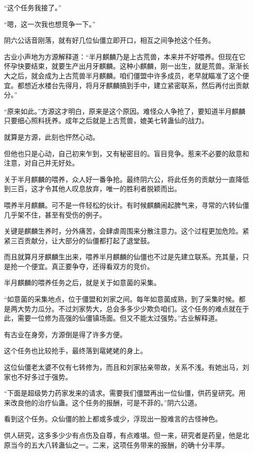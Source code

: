\begin{this_body}
“这个任务我接了。”

“嗯，这一次我也想竞争一下。”

阴六公话音刚落，就有好几位仙僵立即开口，相互之间争抢这个任务。

古业小声地为方源解释道：“半月麒麟乃是上古荒兽，本来并不好喂养。但现在它怀孕快要结束，就要生产出月牙麒麟。这种小麒麟，刚一出生，就是荒兽。渐渐长大之后，就会成为上古荒兽半月麒麟。咱们僵盟中许多成员，老早就瞄准了这个便宜。都想近水楼台先得月，将月牙麒麟搞到手中，建立紧密联系，然后再付出贡献分。”

“原来如此。”方源这才明白，原来是这个原因。难怪众人争抢了，要知道半月麒麟只要细心照料抚养。成年之后就是上古荒兽，媲美七转蛊仙的战力。

就算是方源，此刻也怦然心动。

但他也只是心动，自己初来乍到，又有秘密目的。盲目竞争。惹来不必要的敌意和注意，对自己并无好处。

关于半月麒麟的喂养，众人好一番争抢。最终阴六公，将此任务的贡献分一直降低到三百，这才令其他人叹息放弃，唯一的胜利者脱颖而出。

喂养半月麒麟。可不是一件轻松的伙计。有时候麒麟闹起脾气来，寻常的六转仙僵几乎架不住，甚至有受伤的例子。

关键是麒麟生养时，分外痛苦，会肆虐周围来分散注意力。这个过程更加危险。紧紧三百贡献分，让大部分的仙僵都打起了退堂鼓。

而且就算月牙麒麟生出来，喂养半月麒麟的仙僵也不过是先建立联系。充其量，只是抢一个便宜。真正要争夺，还得看双方的竞价。

半月麒麟的喂养任务之后，就是关于如意菌的采集。

“如意菌的采集地点，位于僵盟和刘家之间。每年如意菌成熟，到了采集时候。都是两大势力瓜分。不过刘家势大，总会多多少少欺负咱们。这个任务的难点就在于此，需要一位修为高强的仙僵镇场面。但又不能太过强势。”古业解释道。

有古业在身旁，方源倒是得了许多方便。

这个任务也比较抢手，最终落到鼋姥姥的身上。

这位仙僵老太婆不仅有七转修为，而且和刘家拈亲带故，关系不浅。有她出马，刘家也不好多过于强势。

“下面是超级势力药家发来的请求。需要我们僵盟再出一位仙僵，供药皇研究。用来改良他的治疗仙蛊。这个任务的报酬，可是不菲的。”阴六公道。

看到这个任务。众仙僵的脸上都或多或少，浮现出一股难言的古怪神色。

供人研究，这多多少少有点伤及自尊，有点难堪。但一来，研究者是药皇，他是北原当今的五大八转蛊仙之一。二来，这项任务带来的报酬，的确十分丰厚。


\end{this_body}
